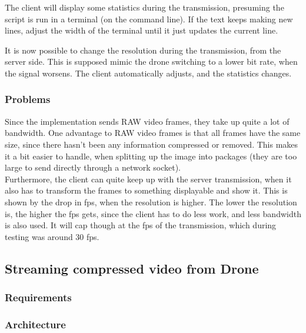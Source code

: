 The client will display some statistics during the transmission, presuming the script is run in a terminal (on the command line). If the text keeps making new lines, adjust the width of the terminal until it just updates the current line.

It is now possible to change the resolution during the transmission, from the server side. This is supposed mimic the drone switching to a lower bit rate, when the signal worsens. The client automatically adjusts, and the statistics changes.\\


\subsubsection{Problems}
Since the implementation sends RAW video frames, they take up quite a lot of bandwidth. One advantage to RAW video frames is that all frames have the same size, since there hasn't been any information compressed or removed. This makes it a bit easier to handle, when splitting up the image into packages (they are too large to send directly through a network socket).\\

Furthermore, the client can quite keep up with the server transmission, when it also has to transform the frames to something displayable and show it. This is shown by the drop in fps, when the resolution is higher. The lower the resolution is, the higher the fps gets, since the client has to do less work, and less bandwidth is also used. It will cap though at the fps of the transmission, which during testing was around 30 fps.

\subsection{Streaming compressed video from Drone}


\subsubsection{Requirements}

\subsubsection{Architecture}

